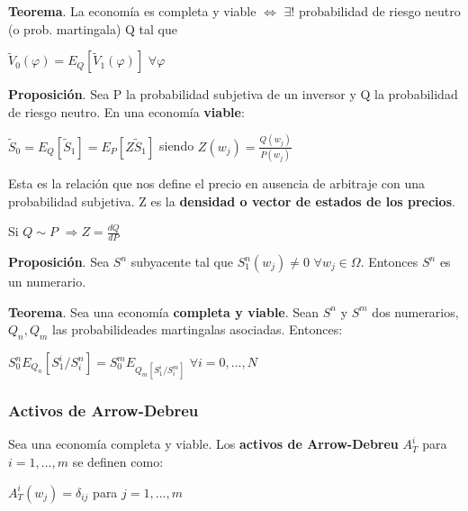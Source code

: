 \documentclass[
10pt, %
a4paper, %
oneside, %
headinclude,footinclude, %
BCOR5mm, %
]{scrartcl}
\newcommand{\n}[1]{\textbf{#1}}
\newcommand{\sub}[1]{_{#1}}
\newcommand{\pot}[1]{^{#1}}
\newcommand{\f}[1]{{\large{${#1}$}}}
\newcommand{\sii}[0]{\Leftrightarrow}
\newcommand{\ent}[0]{\Rightarrow}
\newcounter{ex}
\begin{document}
			\vspace{0.3cm}
			\begin{framed}
			\n{Teorema}. La economía es completa y viable \f{\sii} \f{\exists !} probabilidad de riesgo neutro (o prob. martingala) Q tal que \begin{center} \f{\tilde{V}\sub{0}(\varphi) = E\sub{Q}[\tilde{V}\sub{1}(\varphi)]} \f{\forall \varphi} \end{center}
			\end{framed}
			\vspace{0.3cm}

			\n{Proposición}. Sea P la probabilidad subjetiva de un inversor y Q la probabilidad de riesgo neutro. En una economía \n{viable}: 
			\begin{center} \f{\tilde{S}\sub{0} = E\sub{Q}[\tilde{S}\sub{1}] = E\sub{P}[Z\tilde{S}\sub{1}]} siendo \f{Z(w\sub{j}) = \frac{Q(w\sub{j})}{P(w\sub{j})}} \end{center}

			Esta es la relación que nos define el precio en ausencia de arbitraje con una probabilidad subjetiva. Z es la \n{densidad o vector de estados de los precios}.

			\begin{center} Si \f{Q \sim P} \f{\ent Z = \frac{dQ}{dP}} \end{center}

			\n{Proposición}. Sea \f{S\pot{n}} subyacente tal que \f{S\sub{1}\pot{n}(w\sub{j}) \neq 0} \f{\forall w\sub{j}\in \Omega}. Entonces \f{S\pot{n}} es un numerario.

			\n{Teorema}. Sea una economía \n{completa y viable}. Sean \f{S\pot{n}} y \f{S\pot{m}} dos numerarios, \f{Q\sub{n},Q\sub{m}} las probabilideades martingalas asociadas. Entonces:
			\begin{center} \f{S\sub{0}\pot{n} E\sub{Q\sub{n}}[S\sub{1}\pot{i}/S\sub{i}\pot{n}] = S\sub{0}\pot{m} E\sub{Q\sub{m}[S\sub{1}\pot{i}/S\sub{i}\pot{m}]}} \f{\forall i = 0,...,N} \end{center}

		\subsubsection{Activos de Arrow-Debreu}

			Sea una economía completa y viable. Los \n{activos de Arrow-Debreu} \f{A\sub{T}\pot{i}} para \f{i = 1,...,m} se definen como: 
			\begin{center} \f{A\sub{T}\pot{i}(w\sub{j}) = \delta\sub{ij}} para \f{j = 1,...,m} \end{center}
\end{document}
